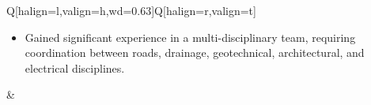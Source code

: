 \begin{table}[h!]
\begin{tblr}{Q[halign=l,valign=h,wd=0.63\textwidth]Q[halign=r,valign=t]}
{{\begin{itemize}
		 \item Gained significant experience in a multi-disciplinary team, requiring coordination between roads, drainage, geotechnical, architectural, and electrical disciplines.
	 \end{itemize}}
	} &  \\
    \end{tblr}
\end{table}
\FloatBarrier
